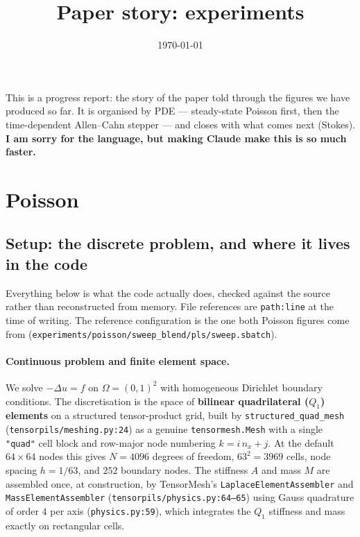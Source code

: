 \documentclass[11pt]{article}
\title{Paper story: experiments}
\date{\today}
\begin{document}
\maketitle

\noindent This is a progress report: the story of the paper told through the figures we have
produced so far. It is organised by PDE --- steady-state Poisson first, then the time-dependent
Allen--Cahn stepper --- and closes with what comes next (Stokes). \textbf{I am sorry for the language, but making Claude make this is so much faster.}

\section{Poisson}

\subsection{Setup: the discrete problem, and where it lives in the code}
\label{sec:poisson-setup}

Everything below is what the code actually does, checked against the source rather than
reconstructed from memory. File references are \texttt{path:line} at the time of writing.
The reference configuration is the one both Poisson figures come from
(\texttt{experiments/poisson/sweep\_blend/pls/sweep.sbatch}).

\paragraph{Continuous problem and finite element space.}
We solve $-\Delta u = f$ on $\Omega = (0,1)^2$ with homogeneous Dirichlet boundary conditions.
The discretisation is the space of \textbf{bilinear quadrilateral ($Q_1$) elements} on a
structured tensor-product grid, built by \texttt{structured\_quad\_mesh}
(\texttt{tensorpils/meshing.py:24}) as a genuine \texttt{tensormesh.Mesh} with a single
\texttt{"quad"} cell block and row-major node numbering $k = i\,n_x + j$. At the default
$64\times 64$ nodes this gives $N = 4096$ degrees of freedom, $63^2 = 3969$ cells, node spacing
$h = 1/63$, and $252$ boundary nodes. The stiffness $A$ and mass $M$ are assembled once, at
construction, by TensorMesh's \texttt{LaplaceElementAssembler} and \texttt{MassElementAssembler}
(\texttt{tensorpils/physics.py:64--65}) using Gauss quadrature of order $4$ per axis
(\texttt{physics.py:59}), which integrates the $Q_1$ stiffness and mass exactly on rectangular
cells.
\end{document}
